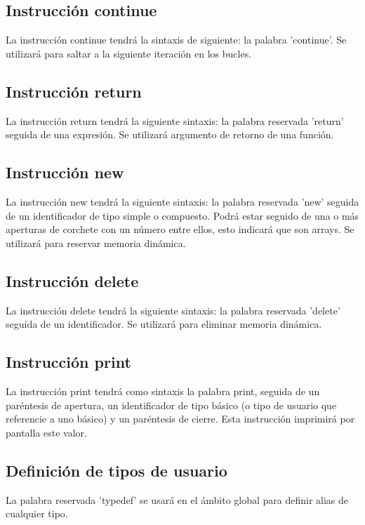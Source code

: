 \documentclass{article}
\begin{document}
\subsection{Instrucción continue}

La instrucción continue tendrá la sintaxis de siguiente: la palabra 'continue'. Se utilizará para saltar a la siguiente iteración en los bucles.

\subsection{Instrucción return}

La instrucción return tendrá la siguiente sintaxis: la palabra reservada 'return' seguida de una expresión. Se utilizará argumento de retorno de una función.

\subsection{Instrucción new\footnotemark[1]}

La instrucción new tendrá la siguiente sintaxis: la palabra reservada 'new' seguida de un identificador de tipo simple o compuesto. Podrá estar seguido de una o más aperturas de corchete con un número entre ellos, esto indicará que son arrays. Se utilizará para reservar memoria dinámica.

\subsection{Instrucción delete\footnotemark[1]}

La instrucción delete tendrá la siguiente sintaxis: la palabra reservada 'delete' seguida de un identificador. Se utilizará para eliminar memoria dinámica.

\subsection{Instrucción print}

La instrucción print tendrá como sintaxis la palabra print, seguida de un paréntesis de apertura, un identificador de tipo básico (o tipo de usuario que referencie a uno básico) y un paréntesis de cierre. Esta instrucción imprimirá por pantalla este valor.

\subsection{Definición de tipos de usuario}
La palabra reservada 'typedef' se usará en el ámbito global para definir alias de cualquier tipo.
\end{document}

